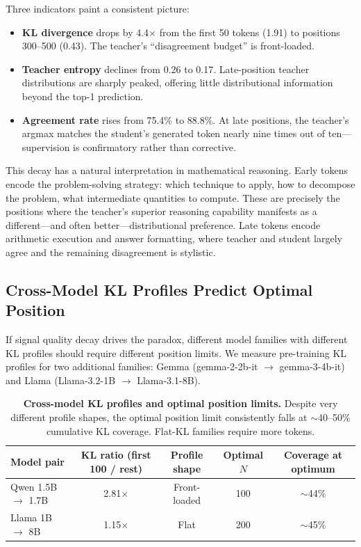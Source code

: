 Three indicators paint a consistent picture:
\begin{itemize}[leftmargin=*,itemsep=2pt,topsep=2pt]
    \item \textbf{KL divergence} drops by 4.4$\times$ from the first 50 tokens (1.91) to positions 300--500 (0.43). The teacher's ``disagreement budget'' is front-loaded.
    \item \textbf{Teacher entropy} declines from 0.26 to 0.17. Late-position teacher distributions are sharply peaked, offering little distributional information beyond the top-1 prediction.
    \item \textbf{Agreement rate} rises from 75.4\% to 88.8\%. At late positions, the teacher's argmax matches the student's generated token nearly nine times out of ten---supervision is confirmatory rather than corrective.
\end{itemize}

This decay has a natural interpretation in mathematical reasoning.
Early tokens encode the problem-solving strategy: which technique to apply, how to decompose the problem, what intermediate quantities to compute.
These are precisely the positions where the teacher's superior reasoning capability manifests as a different---and often better---distributional preference.
Late tokens encode arithmetic execution and answer formatting, where teacher and student largely agree and the remaining disagreement is stylistic.

\subsection{Cross-Model KL Profiles Predict Optimal Position}
\label{sec:cross_model}

If signal quality decay drives the paradox, different model families with different KL profiles should require different position limits.
We measure pre-training KL profiles for two additional families: Gemma (gemma-2-2b-it $\to$ gemma-3-4b-it) and Llama (Llama-3.2-1B $\to$ Llama-3.1-8B).

\begin{table}[t]
\centering
\caption{\textbf{Cross-model KL profiles and optimal position limits.} Despite very different profile shapes, the optimal position limit consistently falls at $\sim$40--50\% cumulative KL coverage. Flat-KL families require more tokens.}
\label{tab:cross_model_kl}
\small
\begin{tabular}{@{}lcccc@{}}
\toprule
Model pair & KL ratio (first 100 / rest) & Profile shape & Optimal $N$ & Coverage at optimum \\
\midrule
Qwen 1.5B $\to$ 1.7B & 2.81$\times$ & Front-loaded & 100 & ${\sim}$44\% \\
Llama 1B $\to$ 8B    & 1.15$\times$ & Flat         & 200 & ${\sim}$45\% \\
\bottomrule
\end{tabular}
\end{table}

